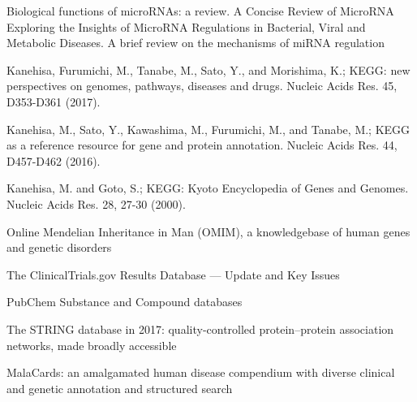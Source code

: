  Biological functions of microRNAs: a review.
 A Concise Review of MicroRNA Exploring the Insights of MicroRNA Regulations in Bacterial, Viral and Metabolic Diseases.
 A brief review on the mechanisms of miRNA regulation



 Kanehisa, Furumichi, M., Tanabe, M., Sato, Y., and Morishima, K.; 
\newblock KEGG: new perspectives on genomes, pathways, diseases and drugs. 
\newblock Nucleic Acids Res. 45, D353-D361 (2017).

 Kanehisa, M., Sato, Y., Kawashima, M., Furumichi, M., and Tanabe, M.; 
\newblock KEGG as a reference resource for gene and protein annotation. 
\newblock Nucleic Acids Res. 44, D457-D462 (2016).

 Kanehisa, M. and Goto, S.; 
\newblock KEGG: Kyoto Encyclopedia of Genes and Genomes. 
\newblock Nucleic Acids Res. 28, 27-30 (2000). 

 Online Mendelian Inheritance in Man (OMIM), a knowledgebase of human genes and genetic disorders

 The ClinicalTrials.gov Results Database — Update and Key Issues

 PubChem Substance and Compound databases

 The STRING database in 2017: quality-controlled protein–protein association networks, made broadly accessible

 MalaCards: an amalgamated human disease compendium with diverse clinical and genetic annotation and structured search


